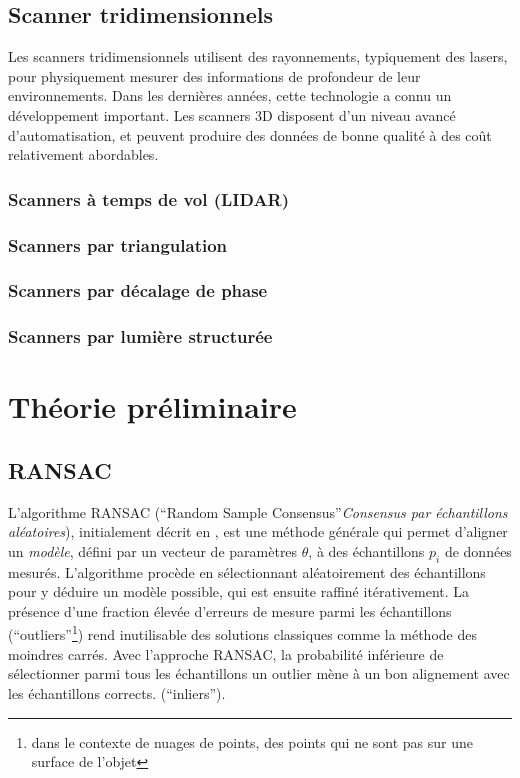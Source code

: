 \documentclass[a4paper,10pt]{scrreprt}
\begin{document}
\subsection{Scanner tridimensionnels}
Les scanners tridimensionnels utilisent des rayonnements, typiquement des lasers, pour physiquement mesurer des informations de profondeur de leur environnements. Dans les dernières années, cette technologie a connu un développement important. Les scanners 3D disposent d'un niveau avancé d'automatisation, et peuvent produire des données de bonne qualité \cite{Grus2012} à des coût relativement abordables.

\subsubsection{Scanners à temps de vol (LIDAR)}
\subsubsection{Scanners par triangulation}
\subsubsection{Scanners par décalage de phase}
\subsubsection{Scanners par lumière structurée}


\section{Théorie préliminaire}

\subsection{RANSAC}
L'algorithme RANSAC (``Random Sample Consensus''\emph{Consensus par échantillons aléatoires}), initialement décrit en \cite{Fisc1980}, est une méthode générale qui permet d'aligner un \emph{modèle}, défini par un vecteur de paramètres $\theta$, à des échantillons $p_i$ de données mesurés. L'algorithme procède en sélectionnant aléatoirement des échantillons pour y déduire un modèle possible, qui est ensuite raffiné itérativement. La présence d'une fraction élevée d'erreurs de mesure parmi les échantillons (``outliers''\footnote{dans le contexte de nuages de points, des points qui ne sont pas sur une surface de l'objet}) rend inutilisable des solutions classiques comme la méthode des moindres carrés. Avec l'approche RANSAC, la probabilité inférieure de sélectionner parmi tous les échantillons un outlier mène à un bon alignement avec les échantillons corrects. (``inliers'').
\end{document}
